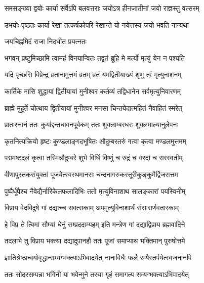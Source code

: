 \twolineshloka
{समसङ्ख्या द्वयोः कार्या सर्वेऽपि बलवत्तराः}
{जयोऽत्र हीनजातीनां जयो राज्ञस्तु वत्सरम्} %

\twolineshloka
{उभयोः पृष्ठतः कार्या रेखा तत्कर्षकोपरि}
{रेखान्ते यो नयेत्तस्य जयो भवति नान्यथा} %


\onelineshloka
{जयचिह्नमिदं राजा निदधीत प्रयत्नतः} %





\twolineshloka
{भगवन् प्रष्टुमिच्छामि त्वामहं विनयान्वितः}
{तद्व्रतं ब्रूहि मे मर्त्यो मृत्युं येन न पश्यति} %


\twolineshloka
{यदि पृच्छसि विप्रेन्द्र व्रतानामुत्तमं व्रतम्}
{व्रतं यमद्वितीयाख्यं शृणु त्वं मृत्युनाशनम्} %

\twolineshloka
{कार्तिके मासि शुद्धायां द्वितीयायां मुनीश्वर}
{कर्तव्यं तद्विधानेन सर्वमृत्युनिवारणम्} %

\twolineshloka
{ब्राह्मे मुहूर्ते चोत्थाय द्वितीयायां मुनीश्वर}
{मनसा चिन्तयेदात्महितं नैवाहितं स्मरेत्} %

\twolineshloka
{प्रातःस्नानं ततः कुर्याद्दन्तधावनपूर्वकम्}
{ततः शुक्लाम्बरधरः शुक्लमाल्यानुलेपनः} %

\twolineshloka
{कृतनित्यक्रियो हृष्टः कुण्डलाङ्गदभूषितः}
{औदुम्बरतरुं गत्वा कृत्वा मण्डलमुत्तमम्} %

\twolineshloka
{पद्ममष्टदलं कृत्वा तस्मिन्नौदुम्बरे शुभे}
{विधिं विष्णुं च रुद्रं च वरदां च सरस्वतीम्} %

\twolineshloka
{वीणापुस्तकसंयुक्तां पूजयेत्स्वस्थमानसः}
{चन्दनागरुकस्तूरीकुङ्कुमैर्द्विजसत्तम} %

\twolineshloka
{पुष्पैर्धूपैश्च नैवेद्यैर्नारिकेलफलादिभिः}
{ततो मृत्युविनाशाथ सालङ्कारां पयस्विनीम्} %

\twolineshloka
{विप्राय वेदविदुषे गां दद्याच्च सवत्सकाम्}
{अपमृत्युविनाशार्थं संसारार्णवतारकाम्} %

\twolineshloka
{हे विप्र ते त्विमां सौम्यां धेनुं सम्प्रददाम्यहम्}
{इति मन्त्रेण गां दद्याद्विप्राय ब्रह्मवादिने} %

\twolineshloka
{तदलाभे तु विप्राय भक्त्या दद्यादुपानहौ}
{ततः पूजां समाप्याथ भक्तिमान् पुरुषोत्तमे} %

\twolineshloka
{ज्ञातिश्रेष्ठान्वयोवृद्धान्सम्यग्भक्त्याऽभिवादयेत्}
{नानाविधैः फलै रम्यैस्तर्पयेत्स्वजनानपि} %

\twolineshloka
{ततः सोदरसम्पन्ना भगिनी या भवेन्मुने}
{तस्या गृहं समागत्य सम्यग्भक्त्याऽभिवादयेत्} %

